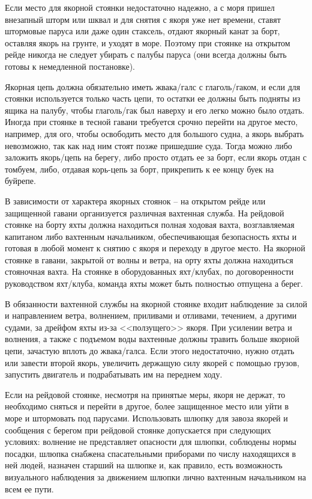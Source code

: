 Если место для якорной стоянки недостаточно надежно, а с моря пришел внезапный шторм или шквал и для снятия с якоря уже нет времени, ставят штормовые паруса или даже один стаксель, отдают якорный канат за борт, оставляя якорь на грунте, и уходят в море. Поэтому при стоянке на открытом рейде никогда не следует убирать с палубы паруса (они всегда должны быть готовы к немедленной постановке).

Якорная цепь должна обязательно иметь жвака\-/галс с глаголь\-/гаком, и если для стоянки используется только часть цепи, то остатки ее должны быть подняты из ящика на палубу, чтобы глаголь\-/гак был наверху и его легко можно было отдать. Иногда при стоянке в тесной гавани требуется срочно перейти на другое место, например, для ого, чтобы освободить место для большого судна, а якорь выбрать невозможно, так как над ним стоят позже пришедшие суда. Тогда можно либо заложить якорь\-/цепь на берегу, либо просто отдать ее за борт, если якорь отдан с томбуем, либо, отдавая корь-цепь за борт, прикрепить к ее концу буек на буйрепе. 

В зависимости от характера якорных стоянок \--- на открытом рейде или защищенной гавани организуется различная вахтенная служба. На рейдовой стоянке на борту яхты должна находиться полная ходовая вахта, возглавляемая капитаном либо вахтенным начальником, обеспечивающая безопасность яхты и готовая в любой момент к снятию с якоря и переходу в другое место. На якорной стоянке в гавани, закрытой от волны и ветра, на орту яхты должна находиться стояночная вахта. На стоянке в оборудованных яхт\-/клубах, по договоренности руководством яхт\-/клуба, команда яхты может быть полностью отпущена а берег.

В обязанности вахтенной службы на якорной стоянке входит наблюдение за силой и направлением ветра, волнением, приливами и отливами, течением, а другими судами, за дрейфом яхты из-за <<ползущего>> якоря. При усилении ветра и волнения, а также с подъемом воды вахтенные должны травить больше якорной цепи, зачастую вплоть до жвака\-/галса. Если этого недостаточно, нужно отдать или завести второй якорь, увеличить держащую силу якорей с помощью грузов, запустить двигатель и подрабатывать им на переднем ходу.

Если на рейдовой стоянке, несмотря на принятые меры, якоря не держат, то необходимо сняться и перейти в другое, более защищенное место или уйти в море и штормовать под парусами. Использовать шлюпку для завоза якорей и сообщения с берегом при рейдовой стоянке допускается при следующих условиях: волнение не представляет опасности для шлюпки, соблюдены нормы посадки, шлюпка снабжена спасательными приборами по числу находящихся в ней людей, назначен старший на шлюпке и, как правило, есть возможность визуального наблюдения за движением шлюпки лично вахтенным начальником на всем ее пути. 

